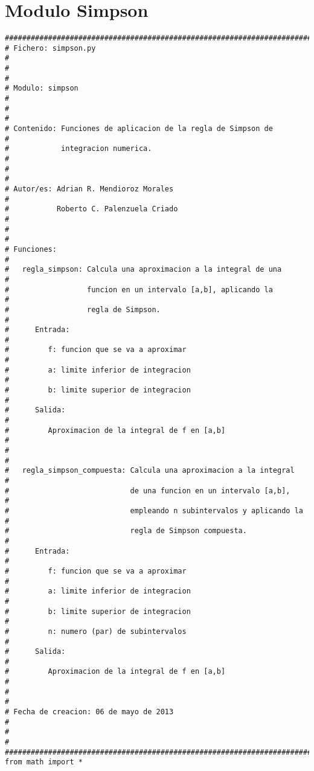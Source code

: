 \section{Modulo Simpson}
\label{Apendice2:Simpson}

\begin{center}
\begin{footnotesize}
\begin{verbatim}
########################################################################
# Fichero: simpson.py                                                 #
#                                                                     #
# Modulo: simpson                                                     #
#                                                                     #
# Contenido: Funciones de aplicacion de la regla de Simpson de        # 
#            integracion numerica.                                    #
#                                                                     #
# Autor/es: Adrian R. Mendioroz Morales                               #
#           Roberto C. Palenzuela Criado                              #
#                                                                     #
# Funciones:                                                          #
#   regla_simpson: Calcula una aproximacion a la integral de una      #
#                  funcion en un intervalo [a,b], aplicando la        #
#                  regla de Simpson.                                  #
#      Entrada:                                                       #
#         f: funcion que se va a aproximar                            #
#         a: limite inferior de integracion                           #
#         b: limite superior de integracion                           #
#      Salida:                                                        #
#         Aproximacion de la integral de f en [a,b]                   #
#                                                                     #
#   regla_simpson_compuesta: Calcula una aproximacion a la integral   #
#                            de una funcion en un intervalo [a,b],    #
#                            empleando n subintervalos y aplicando la #
#                            regla de Simpson compuesta.              #
#      Entrada:                                                       #
#         f: funcion que se va a aproximar                            #
#         a: limite inferior de integracion                           #
#         b: limite superior de integracion                           #
#         n: numero (par) de subintervalos                            #
#      Salida:                                                        #
#         Aproximacion de la integral de f en [a,b]                   #
#                                                                     #    
# Fecha de creacion: 06 de mayo de 2013                               # 
#                                                                     #      
########################################################################
from math import *


\end{verbatim}
\end{footnotesize}
\end{center}
